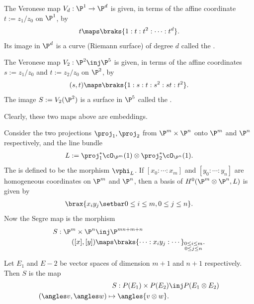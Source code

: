\documentclass[11pt]{report}
\begin{document}
\begin{rmk}
The Veronese map $V_d:\P^1 \to \P^d$ is given, in terms of the affine coordinate $t:=z_1/z_0$ on $\P^1$, by 
\begin{align*}
t \maps  \braks{1:t:t^2:\cdots:t^d}.
\end{align*}
Its image in $\P^d$ is a curve (Riemann surface) of degree $d$ called the .

The Veronese map $V_2 :\P^2 \inj \P^5$ is given, in terms of the affine coordinates $s:=z_1/z_0$ and $t:=z_2/z_0$ on $\P^2$, by
\begin{align*}
(s,t) \maps \braks{1:s:t:s^2:st:t^2}.
\end{align*}
The image $S := V_2(\P^2)$ is a surface in $\P^5$ called the .
\end{rmk}

\begin{rmk}
Clearly, these two maps above are embeddings.
\end{rmk}

\begin{ex}
Consider the two projections $\proj_1,\proj_2$ from $\P^m \times \P^n$ onto $\P^m$ and $\P^n$ respectively, and the line bundle
\begin{align*}
L := \proj_1^*\cO_{\P^m}(1) \otimes \proj_2^* \cO_{\P^n}(1).
\end{align*}
The  is defined to be the morphism $\vphi_L$. If $[x_0:\cdots :x_m]$ and $[y_0:\cdots :y_n]$ are homogeneous coordinates on $\P^m$ and $\P^n$, then a basis of $H^0(\P^m\otimes \P^n,L)$ is given by
\begin{align*}
\brax{x_iy_j \setbar 0 \le i \le m ,0 \le j \le n}.
\end{align*}
Now the Segre map is the morphism
\begin{align*}
S:\P^m \times \P^n & \inj \P^{mn+m+n} \\
([x],[y]) & \maps \braks{\cdots : x_iy_j : \cdots}_{\substack{0 \le i \le m \\ 0 \le j \le n}}.
\end{align*}
\end{ex}

\begin{rmk}
Let $E_1$ and $E-2$ be vector spaces of dimension $m+1$ and $n+1$ respectively. Then $S$ is the map
\begin{align*}
S: P(E_1)\times P(E_2) &\inj P(E_1 \otimes E_2) \\ 
(\angles v, \angles w) \mapsto \angles{v \otimes w}.
\end{align*}
\end{rmk}
\end{document}
